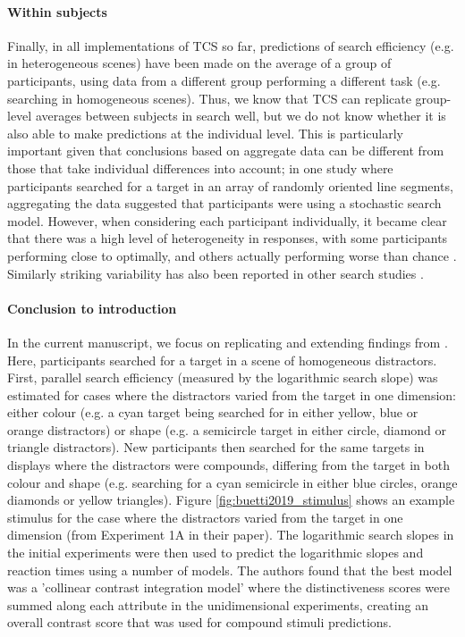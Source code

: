 \documentclass[smallextended]{svjour3}       %
\begin{document}
\paragraph{Within subjects}
Finally, in all implementations of TCS so far, predictions of search efficiency (e.g. in heterogeneous scenes) have been made on the average of a group of participants, using data from a different group performing a different task (e.g. searching in homogeneous scenes). Thus, we know that TCS can replicate group-level averages between subjects in search well, but we do not know whether it is also able to make predictions at the individual level. This is particularly important given that conclusions based on aggregate data can be different from those that take individual differences into account; in one study where participants searched for a target in an array of randomly oriented line segments, aggregating the data suggested that participants were using a stochastic search model. However, when considering each participant individually, it became clear that there was a high level of heterogeneity in responses, with some participants performing close to optimally, and others actually performing worse than chance \cite{nowakowska2017human}. Similarly striking variability has also been reported in other search studies \cite{irons2016choosing, irons2018characterizing}. 

\paragraph{Conclusion to introduction} 
In the current manuscript, we focus on replicating and extending findings from \cite{buetti2019predicting}. Here, participants searched for a target in a scene of homogeneous distractors. First, parallel search efficiency (measured by the logarithmic search slope) was estimated for cases where the distractors varied from the target in one dimension: either colour (e.g. a cyan target being searched for in either yellow, blue or orange distractors) or shape (e.g. a semicircle target in either circle, diamond or triangle distractors). New participants then searched for the same targets in displays where the distractors were compounds, differing from the target in both colour and shape (e.g. searching for a cyan semicircle in either blue circles, orange diamonds or yellow triangles). Figure \ref{fig:buetti2019_stimulus} shows an example stimulus for the case where the distractors varied from the target in one dimension (from Experiment 1A in their paper). The logarithmic search slopes in the initial experiments were then used to predict the logarithmic slopes and reaction times using a number of models. The authors found that the best model was a 'collinear contrast integration model' where the distinctiveness scores were summed along each attribute in the unidimensional experiments, creating an overall contrast score that was used for compound stimuli predictions.
\end{document}
